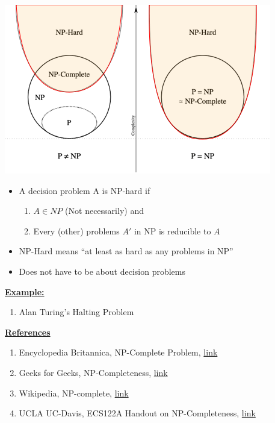 \documentclass[12pt]{article}
\begin{document}
\begin{enumerate}[1.]
\begin{itemize}
        \begin{center}
        \includegraphics[width=0.7\linewidth]{images/worksheet_7_solution_4.png}
        \end{center}

        \begin{itemize}
            \item A decision problem A is NP-hard if

            \begin{enumerate}[1)]
                \item $A \in NP$ (Not necessarily) and
                \item Every (other) problems $A'$ in NP is reducible to $A$
            \end{enumerate}
            \item NP-Hard means ``at least as hard as any problems in NP''
            \item Does not have to be about decision problems
        \end{itemize}

        \underline{\textbf{Example:}}

        \bigskip

        \begin{enumerate}[1)]
            \item Alan Turing's Halting Problem
        \end{enumerate}

    \end{itemize}

    \bigskip

    \underline{\textbf{References}}

    \bigskip

    \begin{enumerate}[1)]
        \item Encyclopedia Britannica, NP-Complete Problem, \href{https://www.britannica.com/science/NP-complete-problem}{link}
        \item Geeks for Geeks, NP-Completeness, \href{https://www.geeksforgeeks.org/np-completeness-set-1/}{link}
        \item Wikipedia, NP-complete, \href{https://simple.wikipedia.org/wiki/NP-complete}{link}
        \item UCLA UC-Davis, ECS122A Handout on NP-Completeness, \href{https://web.cs.ucdavis.edu/~bai/ECS122A/npcnotes.pdf}{link}
    \end{enumerate}
\end{enumerate}
\end{document}

